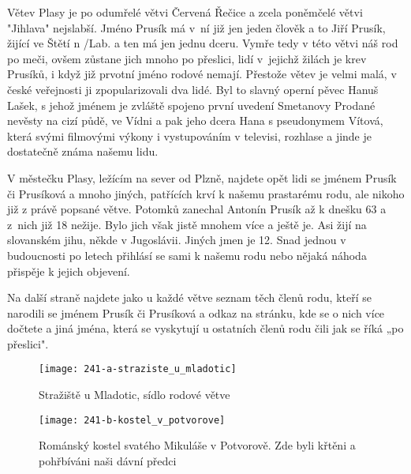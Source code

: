 \documentclass[../dejiny-rodu-prusiku.tex]{subfiles}
\begin{document}
Větev Plasy je po odumřelé větvi Červená Řečice a zcela poněmčelé větvi "Jihlava" nejslabší. Jméno Prusík má v ní již jen jeden člověk a to Jiří Prusík, žijící ve Štětí n /Lab. a ten má jen jednu dceru. Vymře tedy v této větvi náš rod po meči, ovšem zůstane jich mnoho po přeslici, lidí v jejichž žilách je krev Prusíků, i když již prvotní jméno rodové nemají. Přestože větev je velmi malá, v české veřejnosti ji zpopularizovali dva lidé. Byl to slavný operní pěvec Hanuš Lašek, s jehož jménem je zvláště spojeno první uvedení Smetanovy Prodané nevěsty na cizí půdě, ve Vídni a pak jeho dcera Hana s pseudonymem Vítová, která svými filmovými výkony i vystupováním v televisi, rozhlase a jinde je dostatečně známa našemu lidu.

V městečku Plasy, ležícím na sever od Plzně, najdete opět lidi se jménem Prusík či Prusíková a mnoho jiných, patřících krví k našemu prastarému rodu, ale nikoho již z právě popsané větve. Potomků zanechal Antonín Prusík až k dnešku 63 a z nich již 18 nežije. Bylo jich však jistě mnohem více a ještě je. Asi žijí na slovanském jihu, někde v Jugoslávii. Jiných jmen je 12. Snad jednou v budoucnosti po letech přihlásí se sami k našemu rodu nebo nějaká náhoda přispěje k jejich objevení.

Na další straně najdete jako u každé větve seznam těch členů rodu, kteří se narodili se jménem Prusík či Prusíková a odkaz na stránku, kde se o nich více dočtete a jiná jména, která se vyskytují u ostatních členů rodu čili jak se říká „po přeslici".


\begin{figure}
\centering
\texttt{[image: 241-a-straziste\_u\_mladotic]}
\caption{Stražiště u Mladotic, sídlo rodové větve}
\label{fig:241-a-straziste_u_mladotic}
\end{figure}

             \begin{figure}
\centering
\texttt{[image: 241-b-kostel\_v\_potvorove]}
\caption{Románský kostel svatého Mikuláše v Potvorově. Zde byli křtěni a pohřbíváni naši dávní předci}
\label{fig:241-b-kostel_v_potvorove}
\end{figure}
\end{document}
